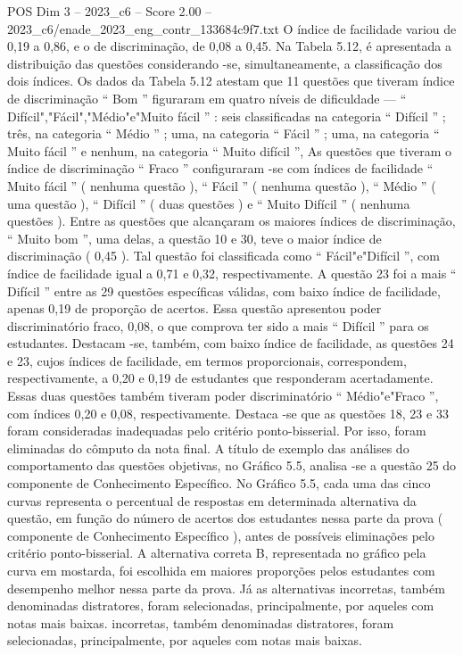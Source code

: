 \begin{textsample}{POS Dim 3 – 2023\_c6 – Score 2.00 – 2023\_c6/enade\_2023\_eng\_contr\_133684c9f7.txt}
O índice de facilidade variou de 0,19 a 0,86, e o de discriminação, de 0,08 a 0,45.
Na Tabela 5.12, é apresentada a distribuição das questões considerando -se, simultaneamente, a classificação dos dois índices.
Os dados da Tabela 5.12 atestam que 11 questões que tiveram índice de discriminação “ Bom ” figuraram em quatro níveis de dificuldade — “ Difícil","Fácil","Médio"e"Muito fácil ” : seis classificadas na categoria “ Difícil ” ; três, na categoria “ Médio ” ; uma, na categoria “ Fácil ” ; uma, na categoria “ Muito fácil ” e nenhum, na categoria “ Muito difícil ”, As questões que tiveram o índice de discriminação “ Fraco ” configuraram -se com índices de facilidade “ Muito fácil ” ( nenhuma questão ), “ Fácil ” ( nenhuma questão ), “ Médio ” ( uma questão ), “ Difícil ” ( duas questões ) e “ Muito Difícil ” ( nenhuma questões ).
Entre as questões que alcançaram os maiores índices de discriminação, “ Muito bom ”, uma delas, a questão 10 e 30, teve o maior índice de discriminação ( 0,45 ).
Tal questão foi classificada como “ Fácil"e"Difícil ”, com índice de facilidade igual a 0,71 e 0,32, respectivamente.
A questão 23 foi a mais “ Difícil ” entre as 29 questões específicas válidas, com baixo índice de facilidade, apenas 0,19 de proporção de acertos.
Essa questão apresentou poder discriminatório fraco, 0,08, o que comprova ter sido a mais “ Difícil ” para os estudantes.
Destacam -se, também, com baixo índice de facilidade, as questões 24 e 23, cujos índices de facilidade, em termos proporcionais, correspondem, respectivamente, a 0,20 e 0,19 de estudantes que responderam acertadamente.
Essas duas questões também tiveram poder discriminatório “ Médio"e"Fraco ”, com índices 0,20 e 0,08, respectivamente.
Destaca -se que as questões 18, 23 e 33 foram consideradas inadequadas pelo critério ponto-bisserial.
Por isso, foram eliminadas do cômputo da nota final.
A título de exemplo das análises do comportamento das questões objetivas, no Gráfico 5.5, analisa -se a questão 25 do componente de Conhecimento Específico.
No Gráfico 5.5, cada uma das cinco curvas representa o percentual de respostas em determinada alternativa da questão, em função do número de acertos dos estudantes nessa parte da prova ( componente de Conhecimento Específico ), antes de possíveis eliminações pelo critério ponto-bisserial.
A alternativa correta B, representada no gráfico pela curva em mostarda, foi escolhida em maiores proporções pelos estudantes com desempenho melhor nessa parte da prova.
Já as alternativas incorretas, também denominadas distratores, foram selecionadas, principalmente, por aqueles com notas mais baixas. incorretas, também denominadas distratores, foram selecionadas, principalmente, por aqueles com notas mais baixas.

\end{textsample}
